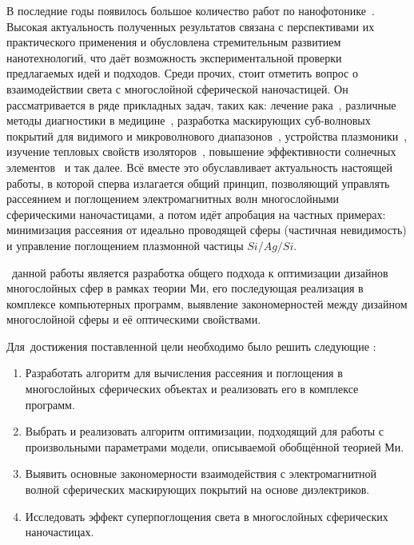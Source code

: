 {\actuality} 

В последние годы появилось большое количество работ по
нанофотонике~\cite{Tame-quantum-plasmonics-2013,
  Javier-graphene-plasmonics-2014, Khurgin-loss-plasmonics-2015,
  He-tunable-terahertz-graphene-metamaterials-2015,
  Segal-meta-nonlinar-PhC-2015,
  Poddubny-hyperbolic-metamaterials-2013, Kildishev-metasurface-2013}.
Высокая актуальность полученных результатов связана с перспективами их
практического применения и обусловлена стремительным развитием
нанотехнологий, что даёт возможность экспериментальной проверки
предлагаемых идей и подходов. Среди прочих, стоит отметить вопрос о
взаимодействии света с многослойной сферической наночастицей. Он
рассматривается в ряде прикладных задач, таких как: лечение
рака~\cite{Zhang-2010, Hirsch-2003}, различные методы диагностики в
медицине~\cite{Allain-2002}, разработка маскирующих суб-волновых
покрытий для видимого и микроволнового диапазонов~\cite{Qui-2009,
  Semouchkina-2013}, устройства плазмоники~\cite{Martin-2013,
  Alu-2005}, изучение тепловых свойств изоляторов~\cite{Xie-2013},
повышение эффективности солнечных элементов~\cite{Kameya-2011,
  Mann-2011} и так далее. Всё вместе это обуславливает актуальность
настоящей работы, в которой сперва излагается общий принцип,
позволяющий управлять рассеянием и поглощением электромагнитных волн
многослойными сферическими наночастицами, а потом идёт апробация на
частных примерах: минимизация рассеяния от идеально проводящей сферы
(частичная невидимость) и управление поглощением плазмонной частицы
$Si/Ag/Si$.

\aim\ данной работы является разработка общего подхода к оптимизации
дизайнов многослойных сфер в рамках теории Ми, его последующая
реализация в комплексе компьютерных программ, выявление
закономерностей между дизайном многослойной сферы и её оптическими
свойствами.

Для~достижения поставленной цели необходимо было решить следующие {\tasks}:
\begin{enumerate}
  \item Разработать алгоритм для вычисления рассеяния и поглощения в
    многослойных сферических объектах и реализовать его в комплексе программ.
  \item Выбрать и реализовать алгоритм оптимизации, подходящий для
    работы с произвольными параметрами модели, описываемой обобщённой
    теорией Ми.
  \item Выявить основные закономерности взаимодействия с
    электромагнитной волной сферических маскирующих покрытий на
    основе диэлектриков.
  \item Исследовать эффект суперпоглощения света в многослойных
    сферических наночастицах.
\end{enumerate}

